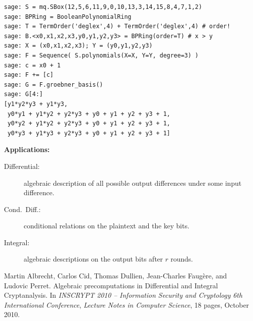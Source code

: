 \documentclass[9pt]{beamer}
\begin{document}
\begin{frame}
\begin{lstlisting}
sage: S = mq.SBox(12,5,6,11,9,0,10,13,3,14,15,8,4,7,1,2)
sage: BPRing = BooleanPolynomialRing 
sage: T = TermOrder('deglex',4) + TermOrder('deglex',4) # order!
sage: B.<x0,x1,x2,x3,y0,y1,y2,y3> = BPRing(order=T) # x > y
sage: X = (x0,x1,x2,x3); Y = (y0,y1,y2,y3)
sage: F = Sequence( S.polynomials(X=X, Y=Y, degree=3) )
sage: c = x0 + 1
sage: F += [c]
sage: G = F.groebner_basis()
sage: G[4:]
[y1*y2*y3 + y1*y3,
 y0*y1 + y1*y2 + y2*y3 + y0 + y1 + y2 + y3 + 1,
 y0*y2 + y1*y2 + y2*y3 + y0 + y1 + y2 + y3 + 1,
 y0*y3 + y1*y3 + y2*y3 + y0 + y1 + y2 + y3 + 1]
\end{lstlisting}

\framebreak

\textbf{Applications:}      
\begin{description}
\item[Differential:] algebraic description of all possible output differences under some input difference.
\item[Cond.\ Diff.:]conditional relations on the plaintext and the key bits.
\item[Integral:] algebraic descriptions on the output bits after $r$ rounds.
\end{description}

\begin{small}
\begin{thebibliography}{inscrypt2010}
Martin Albrecht, Carlos Cid, Thomas Dullien, Jean-Charles Faugère, and Ludovic
  Perret.
\newblock Algebraic precomputations in Differential and Integral Cryptanalysis.
\newblock In {\em INSCRYPT 2010 -- {I}nformation {S}ecurity and {C}ryptology
  6th International Conference}, {\em Lecture Notes in Computer Science}, 18
  pages, October 2010.
\end{thebibliography}
 \end{small}

\end{frame}
\end{document}
